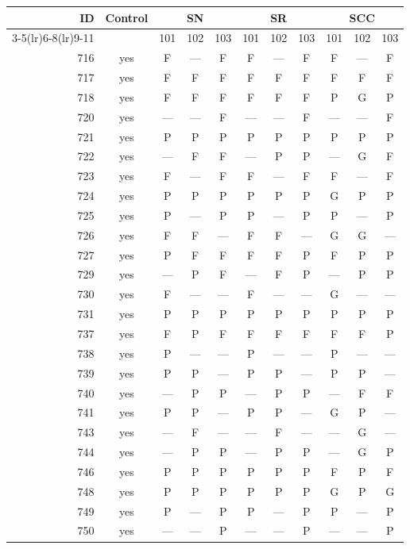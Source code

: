 \begin{table}[p]\centering\small
\begin{tabular*}{\textwidth}{@{\extracolsep{\fill}}rc*{9}{c}@{}}\toprule
ID & Control & \multicolumn{3}{c}{SN} & \multicolumn{3}{c}{SR} & \multicolumn{3}{c}{SCC}\\
\cmidrule(lr){3-5}\cmidrule(lr){6-8}\cmidrule(lr){9-11}
 & & 101 & 102 & 103 & 101 & 102 & 103 & 101 & 102 & 103\\\midrule
716 & yes & F & — & F & F & — & F & F & — & F\\
717 & yes & F & F & F & F & F & F & F & F & F\\
718 & yes & F & F & F & F & F & F & P & G & P\\
720 & yes & — & — & F & — & — & F & — & — & F\\
721 & yes & P & P & P & P & P & P & P & P & P\\
722 & yes & — & F & F & — & P & P & — & G & F\\
723 & yes & F & — & F & F & — & F & F & — & F\\
724 & yes & P & P & P & P & P & P & G & P & P\\
725 & yes & P & — & P & P & — & P & P & — & P\\
726 & yes & F & F & — & F & F & — & G & G & —\\
727 & yes & P & F & F & F & F & P & F & P & P\\
729 & yes & — & P & F & — & F & P & — & P & P\\
730 & yes & F & — & — & F & — & — & G & — & —\\
731 & yes & P & P & P & P & P & P & P & P & P\\
737 & yes & F & P & F & F & F & F & F & F & P\\
738 & yes & P & — & — & P & — & — & P & — & —\\
739 & yes & P & P & — & P & P & — & P & P & —\\
740 & yes & — & P & P & — & P & P & — & F & F\\
741 & yes & P & P & — & P & P & — & G & P & —\\
743 & yes & — & F & — & — & F & — & — & G & —\\
744 & yes & — & P & P & — & P & P & — & G & P\\
746 & yes & P & P & P & P & P & P & F & P & F\\
748 & yes & P & P & P & P & P & P & G & P & G\\
749 & yes & P & — & P & P & — & P & P & — & P\\
750 & yes & — & — & P & — & — & P & — & — & P\\

\end{tabular*}
\end{table}
